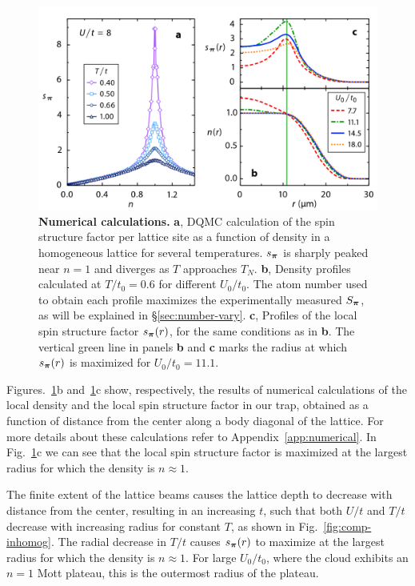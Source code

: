 \begin{figure}
\centering\includegraphics[width=0.8\columnwidth]{../figures/afmpaper/Hulet_fig3.png}
\caption{\textbf{Numerical calculations.} \textbf{a}, DQMC calculation of the
spin structure factor per lattice site as a function of density in a
homogeneous lattice for several temperatures.  $s_{\bm{\pi}}$ is sharply peaked
near $n=1$ and diverges as $T$ approaches $T_{N}$.  \textbf{b}, Density
profiles calculated at $T/t_{0}=0.6$ for different $U_{0}/t_{0}$. The atom
number used to obtain each profile maximizes the experimentally measured
$S_{\bm{\pi}}$, as will be explained in \S\ref{sec:number-vary}.  \textbf{c},
Profiles of the local spin structure factor $s_{\bm{\pi}}(r)$, for the same
conditions as in \textbf{b}.  The vertical green line in panels \textbf{b} and
\textbf{c} marks the radius at which $s_{\bm{\pi}}(r)$ is maximized for
$U_{0}/t_{0}=11.1$.}
\label{fig:bfig3}
\end{figure}

Figures.~\ref{fig:bfig3}b and~\ref{fig:bfig3}c show, respectively, the results
of numerical calculations of the local density and the local spin structure
factor in our trap, obtained as a function of distance from the center along a
body diagonal of the lattice.  For more details about these calculations refer
to Appendix~\ref{app:numerical}.  In Fig.~\ref{fig:bfig3}c we can see that the
local spin structure factor is maximized at the largest radius for which the
density is $n\approx1$.   

The finite extent of the lattice beams causes the lattice depth to decrease
with distance from the center, resulting in an increasing $t$, such that both
$U/t$ and $T/t$ decrease with increasing radius for constant $T$, as shown in
Fig.~\ref{fig:comp-inhomog}.  The radial decrease in $T/t$ causes
$s_{\bm{\pi}}(r)$  to maximize at the largest radius for which the density is
$n\approx1$.   For large $U_{0}/t_{0}$, where the cloud exhibits an $n=1$ Mott
plateau, this is the outermost radius of the plateau.  

